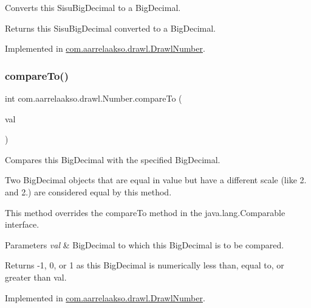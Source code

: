 Converts this Sisu\+Big\+Decimal to a Big\+Decimal. 

\begin{DoxyReturn}{Returns}
this Sisu\+Big\+Decimal converted to a Big\+Decimal. 
\end{DoxyReturn}


Implemented in \hyperlink{classcom_1_1aarrelaakso_1_1drawl_1_1_drawl_number_acf97abc572acd173a4d8cd6c5b5c2ecd}{com.\+aarrelaakso.\+drawl.\+Drawl\+Number}.

\mbox{\label{interfacecom_1_1aarrelaakso_1_1drawl_1_1_number_a8182808f41dc9573e32884e7155f2776}} 
\subsubsection{\texorpdfstring{compare\+To()}{compareTo()}}
{\footnotesize\ttfamily int com.\+aarrelaakso.\+drawl.\+Number.\+compare\+To (\begin{DoxyParamCaption}\item[{@Not\+Null final \hyperlink{interfacecom_1_1aarrelaakso_1_1drawl_1_1_number}{Number}}]{val }\end{DoxyParamCaption})}



Compares this Big\+Decimal with the specified Big\+Decimal. 

Two Big\+Decimal objects that are equal in value but have a different scale (like 2. and 2.) are considered equal by this method. 

This method overrides the compare\+To method in the java.\+lang.\+Comparable interface.


\begin{DoxyParams}{Parameters}
{\em val} & Big\+Decimal to which this Big\+Decimal is to be compared. \\
\hline
\end{DoxyParams}
\begin{DoxyReturn}{Returns}
-\/1, 0, or 1 as this Big\+Decimal is numerically less than, equal to, or greater than val. 
\end{DoxyReturn}


Implemented in \hyperlink{classcom_1_1aarrelaakso_1_1drawl_1_1_drawl_number_a40d2c6535f85306aaf5b6e5886c51266}{com.\+aarrelaakso.\+drawl.\+Drawl\+Number}.


